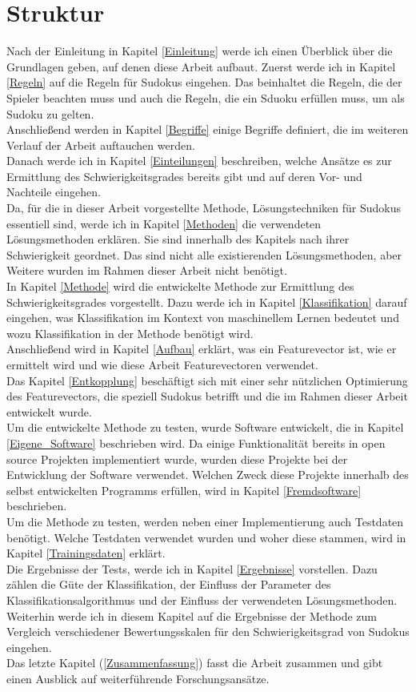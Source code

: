 \newpage
\section{Struktur}
Nach der Einleitung in Kapitel \ref{Einleitung} werde ich einen Überblick über die Grundlagen geben, auf denen diese Arbeit aufbaut. Zuerst werde ich in Kapitel \ref{Regeln} auf die Regeln für Sudokus eingehen. Das beinhaltet die Regeln, die der Spieler beachten muss und auch die Regeln, die ein Sduoku erfüllen muss, um als Sudoku zu gelten. \\
Anschließend werden in Kapitel \ref{Begriffe} einige Begriffe definiert, die im weiteren Verlauf der Arbeit auftauchen werden.\\
Danach werde ich in Kapitel \ref{Einteilungen} beschreiben, welche Ansätze es zur Ermittlung des Schwierigkeitsgrades bereits gibt und auf deren Vor- und Nachteile eingehen.\\
Da, für die in dieser Arbeit vorgestellte Methode, Lösungstechniken für Sudokus essentiell sind, werde ich in Kapitel \ref{Methoden} die verwendeten Lösungsmethoden erklären. Sie sind innerhalb des Kapitels nach ihrer Schwierigkeit geordnet. Das sind nicht alle existierenden Lösungsmethoden, aber Weitere wurden im Rahmen dieser Arbeit nicht benötigt.\\
In Kapitel \ref{Methode} wird die entwickelte Methode zur Ermittlung des Schwierigkeitsgrades vorgestellt. Dazu werde ich in Kapitel \ref{Klassifikation} darauf eingehen, was Klassifikation im Kontext von maschinellem Lernen bedeutet und wozu Klassifikation in der Methode benötigt wird.\\
Anschließend wird in Kapitel \ref{Aufbau} erklärt, was ein Featurevector ist, wie er ermittelt wird und wie diese Arbeit Featurevectoren verwendet.\\
Das Kapitel \ref{Entkopplung} beschäftigt sich mit einer sehr nützlichen Optimierung des Featurevectors, die speziell Sudokus betrifft und die im Rahmen dieser Arbeit entwickelt wurde.\\
Um die entwickelte Methode zu testen, wurde Software entwickelt, die in Kapitel \ref{Eigene_Software} beschrieben wird. Da einige Funktionalität bereits in open source Projekten implementiert wurde, wurden diese Projekte bei der Entwicklung der Software verwendet. Welchen Zweck diese Projekte innerhalb des selbst entwickelten Programms erfüllen, wird in Kapitel \ref{Fremdsoftware} beschrieben.\\
Um die Methode zu testen, werden neben einer Implementierung auch Testdaten benötigt. Welche Testdaten verwendet wurden und woher diese stammen, wird in Kapitel \ref{Trainingsdaten} erklärt.\\
Die Ergebnisse der Tests, werde ich in Kapitel \ref{Ergebnisse} vorstellen. Dazu zählen die Güte der Klassifikation, der Einfluss der Parameter des Klassifikationsalgorithmus und der Einfluss der verwendeten Lösungsmethoden. Weiterhin werde ich in diesem Kapitel auf die Ergebnisse der Methode zum Vergleich verschiedener Bewertungsskalen für den Schwierigkeitsgrad von Sudokus eingehen.\\
Das letzte Kapitel (\ref{Zusammenfassung}) fasst die Arbeit zusammen und gibt einen Ausblick auf weiterführende Forschungsansätze.
